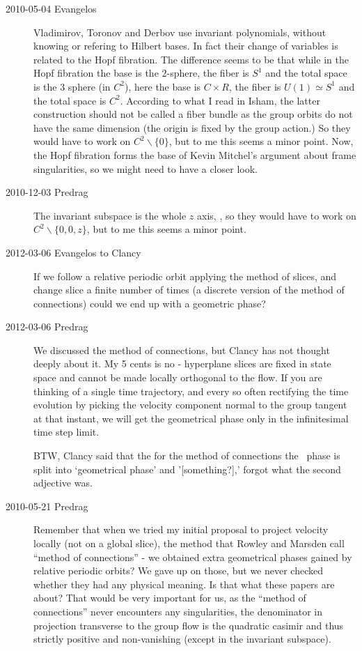 \begin{description}
\item[2010-05-04 Evangelos] Vladimirov, Toronov and
Derbov use invariant polynomials, without knowing or
refering to Hilbert bases. In fact their change of variables is related
to the Hopf fibration. The difference seems to be that while in the Hopf
fibration the base is the $2$-sphere, the fiber is $S^1$ and the total
space is the $3$ sphere (in $C^2$), here the base is $C\times R$, the
fiber is $U(1)\simeq S^1$ and the total space is $C^2$. According to what
I read in Isham, the latter construction should not be called
a fiber bundle as the group orbits do not have the same dimension (the
origin is fixed by the group action.) So they would have to work on
$C^2\backslash \{0\}$, but to me this seems a minor point. Now, the Hopf
fibration forms the base of Kevin Mitchel's argument about frame
singularities, so we might need to have a closer look.

\item[2010-12-03  Predrag] The invariant subspace is the whole $z$ axis,
\ie, so they would have to work on $C^2\backslash \{0,0,z\}$, but to me
this seems a minor point.

\item[2012-03-06 Evangelos to Clancy]
If we follow a relative periodic orbit applying the method of slices, and
change slice a finite number of times (a discrete version of the method
of connections) could we end up with a geometric phase?

\item[2012-03-06 Predrag]
We discussed the method of connections, but Clancy has not thought deeply
about it.  My 5 cents is no - hyperplane slices are fixed in state space
and cannot be made locally orthogonal to the flow. If you are thinking of
a single time trajectory, and every so often rectifying the time
evolution by picking the velocity component normal to the group tangent
at that instant, we will get the geometrical phase only in the
infinitesimal time step limit.

BTW, Clancy said that the for the method of connections the \rpo\ phase
is split into `geometrical phase' and '[something?],'
 forgot what the second adjective was.

\item[2010-05-21 Predrag]
Remember that when we tried my initial proposal to project velocity
locally (not on a global slice), the method that Rowley and
Marsden call ``method of connections'' - we
obtained extra geometrical phases gained by relative periodic orbits? We
gave up on those, but we never checked whether they had any physical
meaning. Is that what these papers are about? That would be very
important for us, as the ``method of connections'' never encounters any
singularities, the denominator in projection transverse to the group flow
is the quadratic casimir and thus strictly positive and non-vanishing
(except in the invariant subspace).


\end{description}

